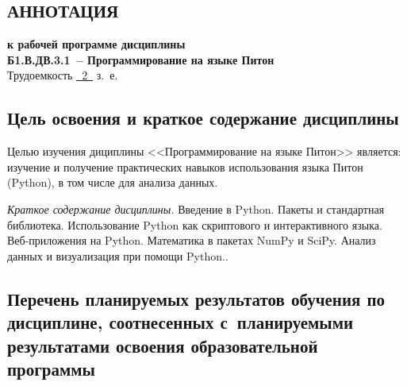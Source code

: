 \documentclass[a4paper,12pt]{article}
\begin{document}
\newpage


\begin{center}
\section{АННОТАЦИЯ}
  {\bf к рабочей программе дисциплины\\
  Б1.В.ДВ.3.1\ -- Программирование на языке Питон} \\
  Трудоемкость \uline{~2~} з.~е.
\end{center}


\subsection{Цель освоения и краткое содержание дисциплины}
  
  Целью изучения дициплины <<Программирование на языке Питон>> является: изучение и получение практических навыков использования языка Питон (Python), в том числе для анализа данных.
  
  
  \textit{Краткое содержание дисциплины.} Введение в Python. Пакеты и стандартная библиотека. Использование Python как скриптового и интерактивного языка. Веб-приложения на Python. Математика в пакетах NumPy и SciPy. Анализ данных и визуализация при помощи Python..
  
  



\subsection{Перечень планируемых результатов обучения по дисциплине, соотнесенных с~планируемыми результатами освоения образовательной программы}
\end{document}
